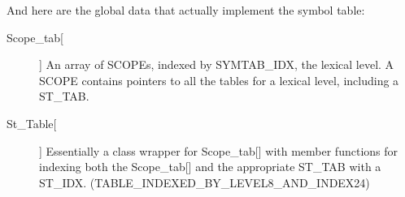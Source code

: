 And here are the global data that actually implement the symbol
table:

\begin{description}

  \item [Scope\_tab[]] An array of SCOPEs, indexed by SYMTAB\_IDX,
  the lexical level.  A SCOPE contains pointers to all the tables
  for a lexical level, including a ST\_TAB.

  \item [St\_Table[]] Essentially a class wrapper for Scope\_tab[]
  with member functions for indexing both the Scope\_tab[] and the
  appropriate ST\_TAB with a ST\_IDX. 
  (TABLE\_INDEXED\_BY\_LEVEL8\_AND\_INDEX24)

\end{description}



%


